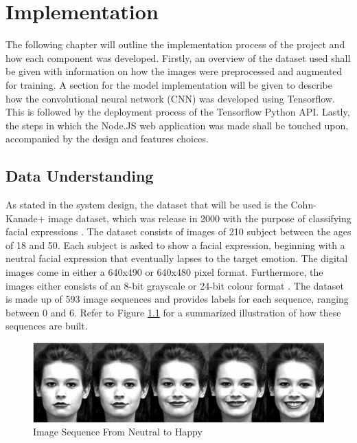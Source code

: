 \chapter{Implementation}
The following chapter will outline the implementation process of the project and how each component was developed. Firstly, an overview of the dataset used shall be given with information on how the images were preprocessed and augmented for training. A section for the model implementation will be given to describe how the convolutional neural network (CNN) was developed using Tensorflow. This is followed by the deployment process of the Tensorflow Python API. Lastly, the steps in which the Node.JS web application was made shall be touched upon, accompanied by the design and features choices.

\section{Data Understanding}
As stated in the system design, the dataset that will be used is the Cohn-Kanade+ image dataset, which was release in 2000 with the purpose of classifying facial expressions \citep{ck}. The dataset consists of images of 210 subject between the ages of 18 and 50. Each subject is asked to show a facial expression, beginning with a neutral facial expression that eventually lapses to the target emotion. The digital images come in either a 640x490 or 640x480 pixel format. Furthermore, the images either consists of an 8-bit grayscale or 24-bit colour format \citep{ck}. The dataset is made up of 593 image sequences and provides labels for each sequence, ranging between 0 and 6. Refer to Figure \ref{seq} for a summarized illustration of how these sequences are built.

\begin{figure}[ht]
	\begin{center}
		\advance\leftskip-3cm
		\advance\rightskip-3cm
		\includegraphics[keepaspectratio=true,scale=0.6]{__resources/DATASET/sequence.png}
		\caption{Image Sequence From Neutral to Happy}
		\label{seq}
	\end{center}
\end{figure}

